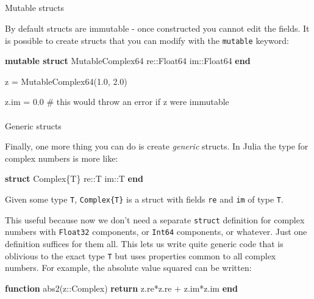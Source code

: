 \documentclass[
]{article}
\makeatletter
\let\oldparagraph\paragraph
\renewcommand{\paragraph}{
    \@ifstar
      \xxxParagraphStar
      \xxxParagraphNoStar
  }
\newcommand{\xxxParagraphStar}[1]{\oldparagraph*{#1}\mbox{}}
\newcommand{\xxxParagraphNoStar}[1]{\oldparagraph{#1}\mbox{}}
\let\oldsubparagraph\subparagraph
\renewcommand{\subparagraph}{
    \@ifstar
      \xxxSubParagraphStar
      \xxxSubParagraphNoStar
  }
\newcommand{\xxxSubParagraphStar}[1]{\oldsubparagraph*{#1}\mbox{}}
\newcommand{\xxxSubParagraphNoStar}[1]{\oldsubparagraph{#1}\mbox{}}
\newenvironment{Shaded}{\begin{snugshade}}{\end{snugshade}}
\newcommand{\CommentTok}[1]{\textcolor[rgb]{0.37,0.37,0.37}{#1}}
\newcommand{\ConstantTok}[1]{\textcolor[rgb]{0.56,0.35,0.01}{#1}}
\newcommand{\ControlFlowTok}[1]{\textcolor[rgb]{0.00,0.23,0.31}{\textbf{#1}}}
\newcommand{\DataTypeTok}[1]{\textcolor[rgb]{0.68,0.00,0.00}{#1}}
\newcommand{\FloatTok}[1]{\textcolor[rgb]{0.68,0.00,0.00}{#1}}
\newcommand{\FunctionTok}[1]{\textcolor[rgb]{0.28,0.35,0.67}{#1}}
\newcommand{\KeywordTok}[1]{\textcolor[rgb]{0.00,0.23,0.31}{\textbf{#1}}}
\newcommand{\NormalTok}[1]{\textcolor[rgb]{0.00,0.23,0.31}{#1}}
\newcommand{\OperatorTok}[1]{\textcolor[rgb]{0.37,0.37,0.37}{#1}}
\makeatother
\begin{document}
\subparagraph{Mutable structs}\label{mutable-structs}

By default structs are immutable - once constructed you cannot edit the
fields. It is possible to create structs that you can modify with the
\texttt{mutable} keyword:

\begin{Shaded}
\begin{Highlighting}[]
\KeywordTok{mutable struct}\NormalTok{ MutableComplex64}
\NormalTok{   re}\OperatorTok{::}\DataTypeTok{Float64}
   \ConstantTok{im}\OperatorTok{::}\DataTypeTok{Float64}
\KeywordTok{end}

\NormalTok{z }\OperatorTok{=} \FunctionTok{MutableComplex64}\NormalTok{(}\FloatTok{1.0}\NormalTok{, }\FloatTok{2.0}\NormalTok{)}

\NormalTok{z.}\ConstantTok{im} \OperatorTok{=} \FloatTok{0.0}  \CommentTok{\# this would throw an error if z were immutable}
\end{Highlighting}
\end{Shaded}

\paragraph{Generic structs}\label{generic-structs}

Finally, one more thing you can do is create \emph{generic} structs. In
Julia the type for complex numbers is more like:

\begin{Shaded}
\begin{Highlighting}[]
\KeywordTok{struct} \DataTypeTok{Complex}\NormalTok{\{T\}}
\NormalTok{   re}\OperatorTok{::}\DataTypeTok{T}
   \ConstantTok{im}\OperatorTok{::}\DataTypeTok{T}
\KeywordTok{end}
\end{Highlighting}
\end{Shaded}

Given some type \texttt{T}, \texttt{Complex\{T\}} is a struct with
fields \texttt{re} and \texttt{im} of type \texttt{T}.

This useful because now we don't need a separate \texttt{struct}
definition for complex numbers with \texttt{Float32} components, or
\texttt{Int64} components, or whatever. Just one definition suffices for
them all. This lets us write quite generic code that is oblivious to the
exact type \texttt{T} but uses properties common to all complex numbers.
For example, the absolute value squared can be written:

\begin{Shaded}
\begin{Highlighting}[]
\KeywordTok{function} \FunctionTok{abs2}\NormalTok{(z}\OperatorTok{::}\DataTypeTok{Complex}\NormalTok{)}
   \ControlFlowTok{return}\NormalTok{ z.re}\OperatorTok{*}\NormalTok{z.re }\OperatorTok{+}\NormalTok{ z.}\ConstantTok{im}\OperatorTok{*}\NormalTok{z.}\ConstantTok{im}
\KeywordTok{end}
\end{Highlighting}
\end{Shaded}
\end{document}
